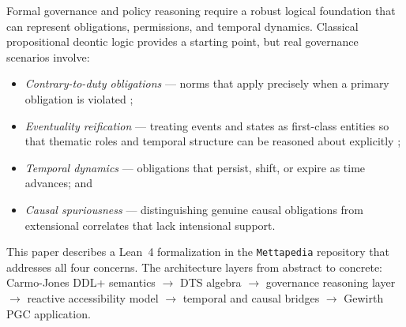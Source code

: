\documentclass[]{article}
\newcommand{\code}[1]{\texttt{#1}}
\newcommand{\DDL}{\textup{DDL+}}
\newcommand{\DTS}{\textup{DTS}}
\newcommand{\PGC}{\textup{PGC}}
\begin{document}
Formal governance and policy reasoning require a robust logical foundation that
can represent obligations, permissions, and temporal dynamics.
Classical propositional deontic logic
\cite{vonWright1951} provides a starting point, but real governance scenarios
involve:
\begin{itemize}
\item \emph{Contrary-to-duty obligations} --- norms that apply precisely when
      a primary obligation is violated \cite{CarmoJones2002};
\item \emph{Eventuality reification} --- treating events and states as
      first-class entities so that thematic roles and temporal structure
      can be reasoned about explicitly \cite{Hobbs1985};
\item \emph{Temporal dynamics} --- obligations that persist, shift, or
      expire as time advances; and
\item \emph{Causal spuriousness} --- distinguishing genuine causal obligations
      from extensional correlates that lack intensional support.
\end{itemize}

This paper describes a Lean~4 formalization in the \code{Mettapedia} repository
that addresses all four concerns.
The architecture layers from abstract to concrete:
Carmo-Jones \DDL{} semantics $\to$ \DTS{} algebra $\to$ governance reasoning layer
$\to$ reactive accessibility model $\to$ temporal and causal bridges $\to$
Gewirth \PGC{} application.
\end{document}
